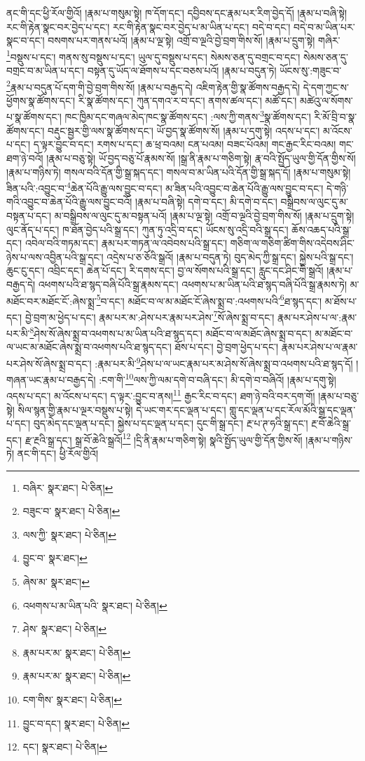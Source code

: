 ནང་གི་དང་ཕྱི་རོལ་གྱིའོ། །རྣམ་པ་གསུམ་སྟེ། ཁ་དོག་དང་། དབྱིབས་དང་རྣམ་པར་རིག་བྱེད་དོ། །རྣམ་པ་བཞི་སྟེ། རང་གི་རྟེན་སྣང་བར་བྱེད་པ་དང་། རང་གི་རྟེན་སྣང་བར་བྱེད་པ་མ་ཡིན་པ་དང་། བདེ་བ་དང་། བདེ་བ་མ་ཡིན་པར་སྣང་བ་དང་། བསགས་པར་གནས་པའོ། །རྣམ་པ་ལྔ་སྟེ། འགྲོ་བ་ལྔའི་བྱེ་བྲག་གིས་སོ། །རྣམ་པ་དྲུག་སྟེ། གཞིར་\footnote{བཞིར་  སྣར་ཐང་།  པེ་ཅིན། }བསྡུས་པ་དང་། གནས་སུ་བསྡུས་པ་དང་། ཡུལ་དུ་བསྡུས་པ་དང་། སེམས་ཅན་དུ་བགྲང་བ་དང་། སེམས་ཅན་དུ་བགྲང་བ་མ་ཡིན་པ་དང་། བསྟན་དུ་ཡོད་ལ་ཐོགས་པ་དང་བཅས་པའོ། །རྣམ་པ་བདུན་ཏེ། ཡོངས་སུ་:གཟུང་བ་\footnote{བཟུང་བ་  སྣར་ཐང་།  པེ་ཅིན། }རྣམ་པ་བདུན་པོ་དག་གི་བྱེ་བྲག་གིས་སོ། །རྣམ་པ་བརྒྱད་དེ། འཇིག་རྟེན་གྱི་སྣ་ཚོགས་བརྒྱད་དེ། དེ་དག་ཀྱང་ས་ཕྱོགས་སྣ་ཚོགས་དང་། རི་སྣ་ཚོགས་དང་། ཀུན་དགའ་ར་བ་དང་། ནགས་ཚལ་དང་། མཚོ་དང་། མཚེའུ་ལ་སོགས་པ་སྣ་ཚོགས་དང་། ཁང་ཁྱིམ་དང་གཞལ་མེད་ཁང་སྣ་ཚོགས་དང་། :ལས་ཀྱི་གནས་\footnote{ལས་ཀྱི་  སྣར་ཐང་།  པེ་ཅིན། }སྣ་ཚོགས་དང་། རི་མོ་བྲི་བ་སྣ་ཚོགས་དང་། བརྡུང་སྦྱར་གྱི་ལས་སྣ་ཚོགས་དང་། ཡོ་བྱད་སྣ་ཚོགས་སོ། །རྣམ་པ་དགུ་སྟེ། འདས་པ་དང་། མ་འོངས་པ་དང་། ད་ལྟར་བྱུང་བ་དང་། རགས་པ་དང་། ཆ་ཕྲ་བའམ། ངན་པའམ། བཟང་པོའམ། གང་རྒྱང་རིང་བའམ། གང་ཐག་ཉེ་བའོ། །རྣམ་པ་བཅུ་སྟེ། ཡོ་བྱད་བཅུ་པོ་རྣམས་སོ། །སྒྲ་ནི་རྣམ་པ་གཅིག་སྟེ། རྣ་བའི་སྤྱོད་ཡུལ་གྱི་དོན་གྱིས་སོ། །རྣམ་པ་གཉིས་ཏེ། གསལ་བའི་དོན་གྱི་སྒྲ་སྐད་དང་། གསལ་བ་མ་ཡིན་པའི་དོན་གྱི་སྒྲ་སྐད་དོ། །རྣམ་པ་གསུམ་སྟེ། ཟིན་པའི་:འབྱུང་བ་\footnote{བྱུང་བ་  སྣར་ཐང་། }ཆེན་པོའི་རྒྱུ་ལས་བྱུང་བ་དང་། མ་ཟིན་པའི་འབྱུང་བ་ཆེན་པོའི་རྒྱུ་ལས་བྱུང་བ་དང་། དེ་གཉི་གའི་འབྱུང་བ་ཆེན་པོའི་རྒྱུ་ལས་བྱུང་བའོ། །རྣམ་པ་བཞི་སྟེ། དགེ་བ་དང་། མི་དགེ་བ་དང་། བསྒྲིབས་ལ་ལུང་དུ་མ་བསྟན་པ་དང་། མ་བསྒྲིབས་ལ་ལུང་དུ་མ་བསྟན་པའོ། །རྣམ་པ་ལྔ་སྟེ། འགྲོ་བ་ལྔའི་བྱེ་བྲག་གིས་སོ། །རྣམ་པ་དྲུག་སྟེ། ལུང་ནོད་པ་དང་། ཁ་ཐོན་བྱེད་པའི་སྒྲ་དང་། ཀུན་ཏུ་འདྲི་བ་དང་། ཡོངས་སུ་འདྲི་བའི་སྒྲ་དང་། ཆོས་འཆད་པའི་སྒྲ་དང་། འབེལ་བའི་གཏམ་དང་། རྣམ་པར་གཏན་ལ་འབེབས་པའི་སྒྲ་དང་། གཅིག་ལ་གཅིག་ཚིག་གིས་འདེབས་ཤིང་ཉེས་པ་ལས་འབྱིན་པའི་སྒྲ་དང་། འདྲེས་པ་ཅ་ཅོའི་སྒྲའོ། །རྣམ་པ་བདུན་ཏེ། བུད་མེད་ཀྱི་སྒྲ་དང་། སྐྱེས་པའི་སྒྲ་དང་། ཆུང་ངུ་དང་། འབྲིང་དང་། ཆེན་པོ་དང་། རི་དགས་དང་། བྱ་ལ་སོགས་པའི་སྒྲ་དང་། རླུང་དང་ཤིང་གི་སྒྲའོ། །རྣམ་པ་བརྒྱད་དེ། འཕགས་པའི་ཐ་སྙད་བཞི་པོའི་སྒྲ་རྣམས་དང་། འཕགས་པ་མ་ཡིན་པའི་ཐ་སྙད་བཞི་པོའི་སྒྲ་རྣམས་ཏེ། མ་མཐོང་བར་མཐོང་ངོ་:ཞེས་སྨྲ་\footnote{ཞེས་མ་  སྣར་ཐང་། }བ་དང་། མཐོང་བ་ལ་མ་མཐོང་ངོ་ཞེས་སྨྲ་བ་:འཕགས་པའི་\footnote{འཕགས་པ་མ་ཡིན་པའི་  སྣར་ཐང་།  པེ་ཅིན། }ཐ་སྙད་དང་། མ་ཐོས་པ་དང་། བྱེ་བྲག་མ་ཕྱེད་པ་དང་། རྣམ་པར་མ་:ཤེས་པར་རྣམ་པར་ཤེས་\footnote{ཤེས་  སྣར་ཐང་།  པེ་ཅིན། }སོ་ཞེས་སྨྲ་བ་དང་། རྣམ་པར་ཤེས་པ་ལ་:རྣམ་པར་མི་\footnote{རྣམ་པར་མ་  སྣར་ཐང་།  པེ་ཅིན། }ཤེས་སོ་ཞེས་སྨྲ་བ་འཕགས་པ་མ་ཡིན་པའི་ཐ་སྙད་དང་། མཐོང་བ་ལ་མཐོང་ཞེས་སྨྲ་བ་དང་། མ་མཐོང་བ་ལ་ཡང་མ་མཐོང་ཞེས་སྨྲ་བ་འཕགས་པའི་ཐ་སྙད་དང་། ཐོས་པ་དང་། བྱེ་བྲག་ཕྱེད་པ་དང་། རྣམ་པར་ཤེས་པ་ལ་རྣམ་པར་ཤེས་སོ་ཞེས་སྨྲ་བ་དང་། :རྣམ་པར་མི་\footnote{རྣམ་པར་མ་  སྣར་ཐང་།  པེ་ཅིན། }ཤེས་པ་ལ་ཡང་རྣམ་པར་མ་ཤེས་སོ་ཞེས་སྨྲ་བ་འཕགས་པའི་ཐ་སྙད་དོ། །གཞན་ཡང་རྣམ་པ་བརྒྱད་དེ། :ངག་གི་\footnote{ངག་གིས་  སྣར་ཐང་།  པེ་ཅིན། }ལས་ཀྱི་ལམ་དགེ་བ་བཞི་དང་། མི་དགེ་བ་བཞིའོ། །རྣམ་པ་དགུ་སྟེ། འདས་པ་དང་། མ་འོངས་པ་དང་། ད་ལྟར་:བྱུང་བ་ནས།\footnote{བྱུང་བ་དང་།  སྣར་ཐང་།  པེ་ཅིན། } རྒྱང་རིང་བ་དང་། ཐག་ཉེ་བའི་བར་དག་གོ། །རྣམ་པ་བཅུ་སྟེ། སིལ་སྙན་གྱི་རྣམ་པ་ལྔར་བསྡུས་པ་སྟེ། དེ་ཡང་གར་དང་ལྡན་པ་དང་། གླུ་དང་ལྡན་པ་དང་རོལ་མོའི་སྒྲ་དང་ལྡན་པ་དང་། བུད་མེད་དང་ལྡན་པ་དང་། སྐྱེས་པ་དང་ལྡན་པ་དང་། དུང་གི་སྒྲ་དང་། རྔ་པ་ཊ་ཧའི་སྒྲ་དང་། རྔ་བོ་ཆེའི་སྒྲ་དང་། རྫ་རྔའི་སྒྲ་དང་། སྒྲ་བོ་ཆེའི་སྒྲའོ།\footnote{དང་།  སྣར་ཐང་།  པེ་ཅིན། } །དྲི་ནི་རྣམ་པ་གཅིག་སྟེ། སྣའི་སྤྱོད་ཡུལ་གྱི་དོན་གྱིས་སོ། །རྣམ་པ་གཉིས་ཏེ། ནང་གི་དང་། ཕྱི་རོལ་གྱིའོ། 